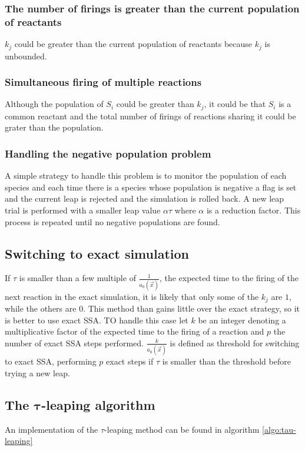     \subsubsection{The number of firings is greater than the current population of reactants}
    $k_j$ could be greater than the current population of reactants because $k_j$ is unbounded.

    \subsubsection{Simultaneous firing of multiple reactions}
    Although the population of $S_i$ could be greater than $k_j$, it could be that $S_i$ is a common reactant and the total number of firings of reactions sharing it could be grater than the population.

    \subsubsection{Handling the negative population problem}
    A simple strategy to handle this problem is to monitor the population of each species and each time there is a species whose population is negative a flag is set and the current leap is rejected and the simulation is rolled back.
    A new leap trial is performed with a smaller leap value $\alpha\tau$ where $\alpha$ is a reduction factor.
    This process is repeated until no negative populations are found.

  \subsection{Switching to exact simulation}
  If $\tau$ is smaller than a few multiple of $\frac{1}{a_0(\vec{x})}$, the expected time to the firing of the next reaction in the exact simulation, it is likely that only some of the $k_j$ are $1$, while the others are $0$.
  This method than gains little over the exact strategy, so it is better to use exact SSA.
  TO handle this case let $k$ be an integer denoting a multiplicative factor of the expected time to the firing of a reaction and $p$ the number of exact SSA steps performed.
  $\frac{k}{a_0(\vec{x})}$ is defined as threshold for switching to exact SSA, performing $p$ exact steps if $\tau$ is smaller than the threshold before trying a new leap.

  \subsection{The $\mathbf{\tau}$-leaping algorithm}
  An implementation of the $\tau$-leaping method can be found in algorithm \ref{algo:tau-leaping}

